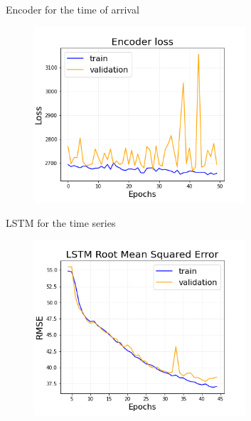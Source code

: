 \documentclass{beamer}
\begin{document}
\begin{frame}{Encoder for the time of arrival}
    \begin{figure}
        \centering
        \includegraphics[width=0.7\textwidth]{figures/enc_loss.png}
    \end{figure}
        
\end{frame}



    

\begin{frame}{LSTM for the time series}

    \begin{figure}
        \centering
        \includegraphics[width=0.7\textwidth]{figures/lstm_rmse.png}
    \end{figure}

\end{frame}
\end{document}
